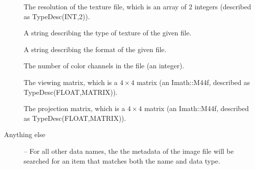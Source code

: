 \begin{description}
\item[\spc] \spc
\vspace{-12pt} \item[\rm {}] The resolution of the texture file, which
is an array of 2 integers (described as {\cf TypeDesc(INT,2)}).

\item[\rm {}] A string describing the type of texture
of the given file.  

\item[\rm {}] A string describing the format of the
given file.  

\item[\rm {}] The number of color channels in the file 
(an integer).

\item[\rm {}] The viewing matrix, which is a
$4 \times 4$ matrix (an {\cf Imath::M44f}, described as {\cf
  TypeDesc(FLOAT,MATRIX)}).

\item[\rm {}] The projection matrix, which is a
$4 \times 4$ matrix (an {\cf Imath::M44f}, described as {\cf
  TypeDesc(FLOAT,MATRIX)}).

\item[Anything else] -- For all other data names, the
the metadata of the image file will be searched for an item that
matches both the name and data type.

\end{description}
\apiend





\chapwidthend
